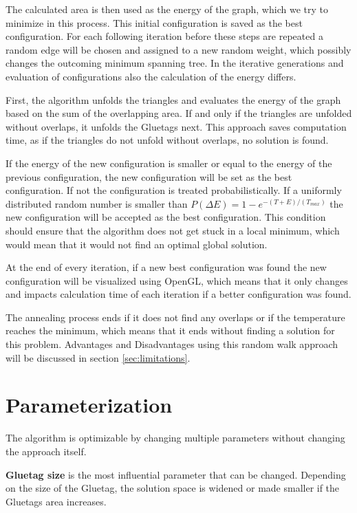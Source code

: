 \documentclass[draft,final]{vutinfth} %
\begin{document}
The calculated area is then used as the energy of the graph, which we try to minimize in this process. This initial configuration is saved as the best configuration. For each following iteration before these steps are repeated a random edge will be chosen and assigned to a new random weight, which possibly changes the outcoming minimum spanning tree. In the iterative generations and evaluation of configurations also the calculation of the energy differs. 

First, the algorithm unfolds the triangles and evaluates the energy of the graph based on the sum of the overlapping area. If and only if the triangles are unfolded without overlaps, it unfolds the Gluetags next. This approach saves computation time, as if the triangles do not unfold without overlaps, no solution is found.

If the energy of the new configuration is smaller or equal to the energy of the previous configuration, the new configuration will be set as the best configuration. If not the configuration is treated probabilistically. If a uniformly distributed random number is smaller than $P(\Delta E) = 1 - e^{-(T + E)/(T_{max})}$ the new configuration will be accepted as the best configuration. This condition should ensure that the algorithm does not get stuck in a local minimum, which would mean that it would not find an optimal global solution.

At the end of every iteration, if a new best configuration was found the new configuration will be visualized using OpenGL, which means that it only changes and impacts calculation time of each iteration if a better configuration was found. 

The annealing process ends if it does not find any overlaps or if the temperature reaches the minimum, which means that it ends without finding a solution for this problem. Advantages and Disadvantages using this random walk approach will be discussed in section \ref{sec:limitations}.

\section{Parameterization}
The algorithm is optimizable by changing multiple parameters without changing the approach itself.

\textbf{Gluetag size} is the most influential parameter that can be changed. Depending on the size of the Gluetag, the solution space is widened or made smaller if the Gluetags area increases.
\end{document}
